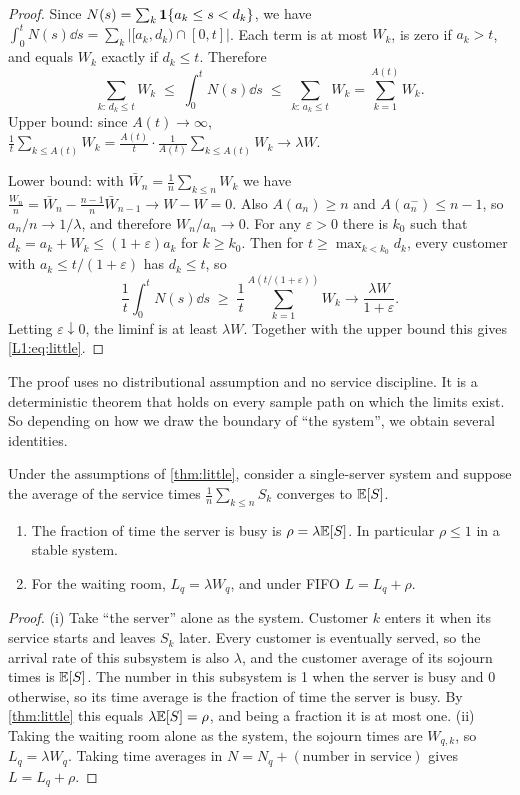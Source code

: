 \begin{proof}
Since $N(s)=\sum_k\mathbf{1}\{a_k\le s<d_k\}$, we have
$\int_0^tN(s)\dd s=\sum_k\bigl|[a_k,d_k)\cap[0,t]\bigr|$.
Each term is at most $W_k$, is zero if $a_k>t$, and equals $W_k$ exactly if
$d_k\le t$. Therefore
\begin{equation}\label{L1:eq:little-sandwich}
  \sum_{k:\,d_k\le t}W_k\;\le\;\int_0^tN(s)\dd s\;\le\;\sum_{k:\,a_k\le t}W_k=\sum_{k=1}^{A(t)}W_k .
\end{equation}
Upper bound: since $A(t)\to\infty$,
$\frac1t\sum_{k\le A(t)}W_k=\frac{A(t)}{t}\cdot\frac{1}{A(t)}\sum_{k\le A(t)}W_k\to\lambda W$.

Lower bound: with $\bar W_n=\frac1n\sum_{k\le n}W_k$ we have
$\frac{W_n}{n}=\bar W_n-\frac{n-1}{n}\bar W_{n-1}\to W-W=0$. Also $A(a_n)\ge n$ and
$A(a_n^-)\le n-1$, so $a_n/n\to1/\lambda$, and therefore $W_n/a_n\to0$.
For any $\varepsilon>0$ there is $k_0$ such that $d_k=a_k+W_k\le(1+\varepsilon)a_k$ for
$k\ge k_0$. Then for $t\ge\max_{k<k_0}d_k$, every customer with
$a_k\le t/(1+\varepsilon)$ has $d_k\le t$, so
\[
  \frac1t\int_0^tN(s)\dd s\;\ge\;\frac1t\sum_{k=1}^{A(t/(1+\varepsilon))}W_k
  \longrightarrow\frac{\lambda W}{1+\varepsilon}.
\]
Letting $\varepsilon\downarrow0$, the liminf is at least $\lambda W$. Together with
the upper bound this gives \eqref{L1:eq:little}.
\end{proof}

The proof uses no distributional assumption and no service discipline. It is a
deterministic theorem that holds on every sample path on which the limits exist. So
depending on how we draw the boundary of ``the system'', we obtain several identities.

\begin{corollary}\label{cor:busy}
Under the assumptions of \cref{thm:little}, consider a single-server system and
suppose the average of the service times $\frac1n\sum_{k\le n}S_k$ converges to
$\mathbb{E}[S]$.
\begin{enumerate}[label=(\roman*)]
\item The fraction of time the server is busy is $\rho=\lambda\mathbb{E}[S]$. In particular
  $\rho\le1$ in a stable system.
\item For the waiting room, $L_q=\lambda W_q$, and under FIFO $L=L_q+\rho$.
\end{enumerate}
\end{corollary}

\begin{proof}
(i) Take ``the server'' alone as the system. Customer $k$ enters it when its service
starts and leaves $S_k$ later. Every customer is eventually served, so the arrival
rate of this subsystem is also $\lambda$, and the customer average of its sojourn times
is $\mathbb{E}[S]$. The number in this subsystem is 1 when the server is busy and 0 otherwise,
so its time average is the fraction of time the server is busy. By \cref{thm:little}
this equals $\lambda\mathbb{E}[S]=\rho$, and being a fraction it is at most one.
(ii) Taking the waiting room alone as the system, the sojourn times are $W_{q,k}$, so
$L_q=\lambda W_q$. Taking time averages in $N=N_q+(\text{number in service})$ gives
$L=L_q+\rho$.
\end{proof}

